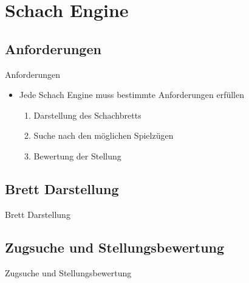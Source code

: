 \section{Schach Engine}

\subsection{Anforderungen}

\begin{frame}{Anforderungen}
\begin{itemize}
\item Jede Schach Engine muss bestimmte Anforderungen erfüllen
	\begin{enumerate}
		\item Darstellung des Schachbretts
		\item Suche nach den möglichen Spielzügen
		\item Bewertung der Stellung
	\end{enumerate}
\end{itemize}
\end{frame}

\subsection{Brett Darstellung}

\begin{frame}{Brett Darstellung}

\end{frame}

\subsection{Zugsuche und Stellungsbewertung}

\begin{frame}{Zugsuche und Stellungsbewertung}

\end{frame}
